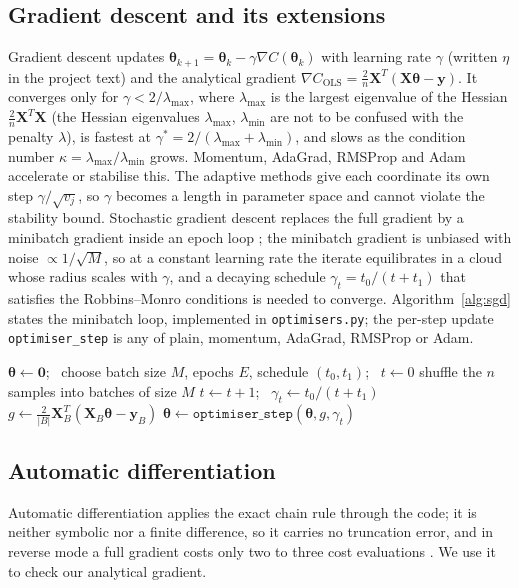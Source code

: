 \documentclass[a4paper,11pt]{article}
\newcommand{\by}{\boldsymbol{y}}
\newcommand{\bX}{\boldsymbol{X}}
\newcommand{\bth}{\boldsymbol{\theta}}
\begin{document}
\subsection{Gradient descent and its extensions}
Gradient descent updates $\bth_{k+1}=\bth_k-\gamma\nabla C(\bth_k)$ with
learning rate $\gamma$ (written $\eta$ in the project text) and the analytical
gradient $\nabla C_{\text{OLS}}=\frac2n\bX^T(\bX\bth-\by)$. It converges only
for $\gamma<2/\lambda_{\max}$, where $\lambda_{\max}$ is the largest eigenvalue
of the Hessian $\frac2n\bX^T\bX$ (the Hessian eigenvalues $\lambda_{\max}$,
$\lambda_{\min}$ are not to be confused with the penalty $\lambda$), is fastest at
$\gamma^\ast=2/(\lambda_{\max}+\lambda_{\min})$, and slows as the condition
number $\kappa=\lambda_{\max}/\lambda_{\min}$ grows. Momentum, AdaGrad, RMSProp
and Adam \cite{duchi2011,kingma2015} accelerate or stabilise this. The adaptive methods
give each coordinate its own step $\gamma/\sqrt{v_j}$, so $\gamma$ becomes a
length in parameter space and cannot violate the stability bound. Stochastic
gradient descent replaces the full gradient by a
minibatch gradient inside an epoch loop \cite{goodfellow2016}; the minibatch
gradient is unbiased with noise $\propto 1/\sqrt{M}$, so at a constant learning
rate the iterate equilibrates in a cloud whose radius scales with $\gamma$, and
a decaying schedule $\gamma_t=t_0/(t+t_1)$ that satisfies the Robbins--Monro
conditions is needed to converge. Algorithm~\ref{alg:sgd} states the minibatch
loop, implemented in \texttt{optimisers.py}; the per-step update
\texttt{optimiser\_step} is any of plain, momentum, AdaGrad, RMSProp or Adam.

\begin{algorithm}[h]
\caption{Minibatch stochastic gradient descent}
\label{alg:sgd}
\begin{algorithmic}[1]
\State $\bth \gets \boldsymbol{0}$; \ choose batch size $M$, epochs $E$, schedule $(t_0,t_1)$; \ $t \gets 0$
  \State shuffle the $n$ samples into batches of size $M$
    \State $t \gets t+1$; \ $\gamma_t \gets t_0/(t+t_1)$
    \State $g \gets \tfrac{2}{|B|}\bX_B^T(\bX_B\bth-\by_B)$ 
    \State $\bth \gets \texttt{optimiser\_step}(\bth, g, \gamma_t)$
  \EndFor
\EndFor
\end{algorithmic}
\end{algorithm}

\subsection{Automatic differentiation}
Automatic differentiation applies the exact chain rule through the code; it is
neither symbolic nor a finite difference, so it carries no truncation error, and
in reverse mode a full gradient costs only two to three cost evaluations
\cite{baydin2018,jax2018}. We use it to check our analytical gradient.
\end{document}
